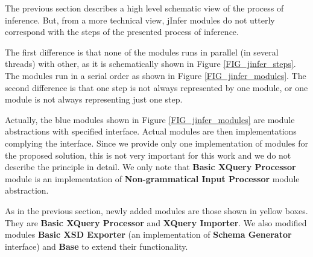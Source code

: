 The previous section describes a high level schematic view of the process of inference. But, from a more technical view, jInfer modules do not utterly correspond with the steps of the presented process of inference.

The first difference is that none of the modules runs in parallel (in several threads) with other, as it is schematically shown in Figure \ref{FIG_jinfer_steps}. The modules run in a serial order as shown in Figure \ref{FIG_jinfer_modules}. The second difference is that one step is not always represented by one module, or one module is not always representing just one step.

Actually, the blue modules shown in Figure \ref{FIG_jinfer_modules} are module abstractions with specified interface. Actual modules are then implementations complying the interface. Since we provide only one implementation of modules for the proposed solution, this is not very important for this work and we do not describe the principle in detail. We only note that \textbf{Basic XQuery Processor} module is an implementation of \textbf{Non-grammatical Input Processor} module abstraction.

As in the previous section, newly added modules are those shown in yellow boxes. They are \textbf{Basic XQuery Processor} and \textbf{XQuery Importer}. We also modified modules \textbf{Basic XSD Exporter} (an implementation of \textbf{Schema Generator} interface) and \textbf{Base} to extend their functionality.

